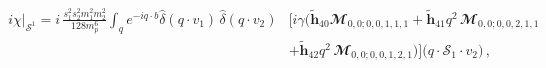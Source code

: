 \begin{align}
    \begin{split}
      i\chi\Big|_{\mathcal{S}^1}  = i\,\frac{s_1^2 s_2^2 m_1^2 m_2^2} {128 m_p^6} \int_{q}e^{-i q\cdot b}\hat\delta(q\cdot v_1)\,\hat\delta(q\cdot v_2)
      &\Bigg[i\gamma\Bigg(\boldsymbol{\tilde h}_{40}\mathbfcal{M}_{0,0;0,0,1,1,1}+\boldsymbol{\tilde h}_{41} q^2\,\mathbfcal{M}_{0,0;0,0,2,1,1}\\&+\boldsymbol{\tilde h}_{42}q^2\,\mathbfcal{M}_{0,0;0,0,    1,2,1}\Bigg)\Bigg]\Big(q\cdot \mathcal{S}_1\cdot v_2\Big)\,,\\&
    \end{split}
\end{align}
